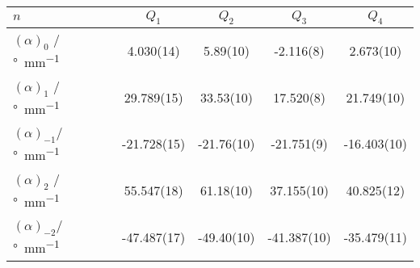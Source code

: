 \begin{tabular}{lS[table-format = 3.3(2)]S[table-format = 3.3(2)]S[table-format = 3.3(2)]S[table-format = 3.3(2)]}
	\toprule
	{$n$}                                & {$Q_1$}                & {$Q_2$}               & {$Q_3$}               & {$Q_4$}               \\
	\midrule
	$(\alpha)_0$   / \si{\degree\per\mm} & 4.030(14)              & 5.89(10)              & -2.116(8)             & 2.673(10)             \\
	$(\alpha)_1$   / \si{\degree\per\mm} & 29.789(15)             & 33.53(10)             & 17.520(8)             & \color{red}21.749(10) \\
	$(\alpha)_{-1}$/ \si{\degree\per\mm} & \color{red}-21.728(15) & \color{red}-21.76(10) & \color{red}-21.751(9) & -16.403(10)           \\
	$(\alpha)_{2}$ / \si{\degree\per\mm} & 55.547(18)             & 61.18(10)             & 37.155(10)            & 40.825(12)            \\
	$(\alpha)_{-2}$/ \si{\degree\per\mm} & -47.487(17)            & -49.40(10)            & -41.387(10)           & -35.479(11)           \\
	\bottomrule
\end{tabular}
